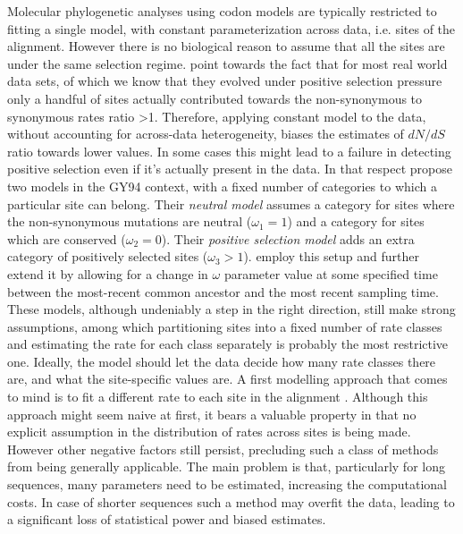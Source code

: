 Molecular phylogenetic analyses using codon models are typically restricted to fitting a single model, with constant parameterization across data, i.e. sites of the alignment.
However there is no biological reason to assume that all the sites are under the same selection regime.
\cite{NY98} point towards the fact that for most real world data sets, of which we know that they evolved under positive selection pressure only a handful of sites actually contributed towards the non-synonymous to synonymous rates ratio >1.
Therefore, applying constant model to the data, without accounting for across-data heterogeneity, biases the estimates of $dN/dS$ ratio towards lower values.
In some cases this might lead to a failure in detecting positive selection even if it's actually present in the data.  
In that respect \cite{NY98} propose two models in the GY94 context, with a fixed number of categories to which a particular site can belong.
Their \emph{neutral model} assumes a category for sites where the non-synonymous mutations are neutral ($\omega_1=1$) and a category for sites which are conserved ($\omega_2=0$).
Their \emph{positive selection model} adds an extra category of positively selected sites ($\omega_3>1$).
\cite{Goode2008} employ this setup and further extend it by allowing for a change in $\omega$ parameter value at some specified time between the most-recent common ancestor and the most recent sampling time.
These models, although undeniably a step in the right direction, still make strong assumptions, among which partitioning sites into a fixed number of rate classes and estimating the rate for each class separately is probably the most restrictive one.
Ideally, the model should let the data decide how many rate classes there are, and what the site-specific values are.
A first modelling approach that comes to mind is to fit a different rate to each site in the alignment \citep{Nielsen1997}.
Although this approach might seem naive at first, it bears a valuable property in that no explicit assumption in the distribution of rates across sites is being made.
However other negative factors still persist, precluding such a class of methods from being generally applicable.
The main problem is that, particularly for long sequences, many parameters need to be estimated, increasing the computational costs.
In case of shorter sequences such a method may overfit the data, leading to a significant loss of statistical power and biased estimates.
